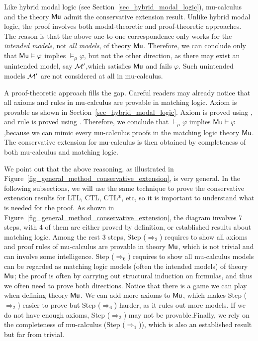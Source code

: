 \documentclass{amsart}
\begin{document}
Like hybrid modal logic (see Section~\ref{sec_hybrid_modal_logic}), 
mu-calculus and the theory $\mathsf{Mu}$
admit the conservative extension result.
Unlike hybrid modal logic, the proof involves
both modal-theoretic and proof-theoretic approaches.
The reason is that the above one-to-one correspondence only works for
the \emph{intended models}, not \emph{all models}, of theory $\mathsf{Mu}$.
Therefore, we can conclude only
that $\mathsf{Mu} \vDash \varphi$ implies $\vDash_\mu \varphi$,
but not the other direction, as there may exist an unintended model, say $\mathcal{M}'$,which satisfies $\mathsf{Mu}$ and fails $\varphi$.
Such unintended models $\mathcal{M}'$ are not considered at all in mu-calculus.

A proof-theoretic approach fills the gap.
Careful readers may already notice that 
all axioms and rules in mu-calculus are provable in matching logic.
Axiom  is provable as shown in Section~\ref{sec_hybrid_modal_logic}.
Axiom  is proved using \Fixmu,
and rule  is proved using \Lfp.
Therefore, we conclude that $\vdash_\mu \varphi$ implies $\mathsf{Mu} \vdash \varphi$,because we can mimic every mu-calculus proofs in the matching logic theory
$\mathsf{Mu}$.
The conservative extension for mu-calculus is then obtained by 
completeness of both mu-calculus and matching logic.

We point out that the above reasoning,
as illustrated in Figure~\ref{fig_general_method_conservative_extension},
is very general.
In the following subsections, 
we will use the same technique to prove
the conservative extension results for LTL, CTL, CTL*, etc,
so it is important to understand what is needed for the proof.
As shown in Figure~\ref{fig_general_method_conservative_extension},
the diagram involves 7 steps, with 4 of them are either proved by definition,
or established results about matching logic.
Among the rest 3 steps,
Step ($\Longrightarrow_2$) requires to show all axioms and proof rules of
mu-calculus
are provable in theory $\mathsf{Mu}$, 
which is not trivial and can involve some intelligence.
Step ($\Longrightarrow_6$) requires to show all mu-calculus models can be
regarded as
matching logic models (often the intended models) of theory $\mathsf{Mu}$;
the proof is often by carrying out structural induction on formulas,
and thus we often need to prove both directions.
Notice that there is a game we can play when defining theory $\mathsf{Mu}$.
We can add more axioms to $\mathsf{Mu}$, which makes Step ($\Longrightarrow_2$) easier
to prove
but Step ($\Longrightarrow_6$) harder, as it rules out more models.
If we do not have enough axioms, Step ($\Longrightarrow_2$) may not be provable.Finally, we rely on the completeness of mu-calculus (Step
($\Longrightarrow_1$)),
which is also an established result but far from trivial.
\end{document}
